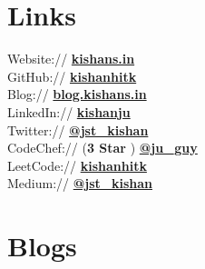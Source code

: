\documentclass[]{deedy-resume-openfont}
\begin{document}
\begin{minipage}[t]{0.28\textwidth}

\section{Links} 

Website:// \href{https://kishans.in}{\bf kishans.in} \\
GitHub:// \href{https://github.com/kishanhitk}{\bf kishanhitk} \\
Blog:// \href{https://blog.kishans.in}{\bf blog.kishans.in} \\
LinkedIn://  \href{https://www.linkedin.com/in/kishanju}{\bf kishanju} \\
Twitter://  \href{https://twitter.com/jst_kishan}{\bf @jst\_kishan} \\
CodeChef:// (\textbf{3 Star} ) \href{https://www.codechef.com/users/ju_guy}{\bf @ju\_guy} \\
LeetCode:// \href{https://leetcode.com/kishanhitk/}{\bf kishanhitk} \\
Medium:// \href{https://medium.com/@jst_kishan}{\bf @jst\_kishan} \\








\section{Blogs}


\end{minipage}
\end{document}
